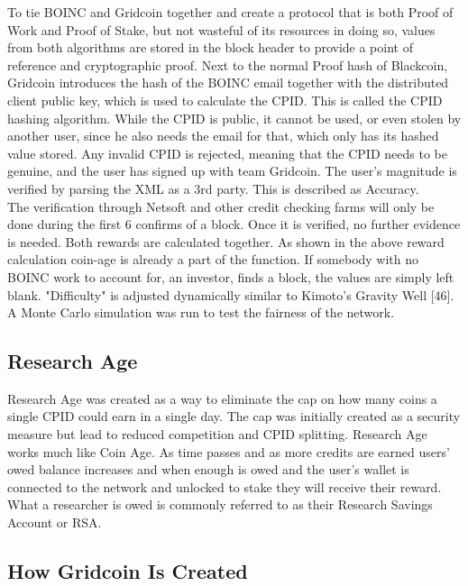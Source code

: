 To tie BOINC and Gridcoin together and create a protocol that is both Proof of Work and Proof of Stake, but not wasteful of its resources in doing so, values from both algorithms are stored in the block header to provide a point of reference and cryptographic proof. Next to the normal Proof hash of Blackcoin, Gridcoin introduces the hash of the BOINC email together with the distributed client public key, which is used to calculate the CPID. This is called the CPID hashing algorithm. While the CPID is public, it cannot be used, or even stolen by another user, since he also needs the email for that, which only has its hashed value stored. Any invalid CPID is rejected, meaning that the CPID needs to be genuine, and the user has signed up with team Gridcoin. The user's magnitude is verified by parsing the XML as a 3rd party. This is described as Accuracy.\\

The verification through Netsoft and other credit checking farms will only be done during the first 6 confirms of a block. Once it is verified, no further evidence is needed. Both rewards are calculated together. As shown in the above reward calculation coin-age is already a part of the function. If somebody with no BOINC work to account for, an investor, finds a block, the values are simply left blank. "Difficulty" is adjusted dynamically similar to Kimoto's Gravity Well [46]. A Monte Carlo simulation was run to test the fairness of the network.

\subsection{Research Age}

Research Age was created as a way to eliminate the cap on how many coins a single CPID could earn in a single day. The cap was initially created as a security measure but lead to reduced competition and CPID splitting. Research Age works much like Coin Age. As time passes and as more credits are earned users' owed balance increases and when enough is owed and the user's wallet is connected to the network and unlocked to stake they will receive their reward. What a researcher is owed is commonly referred to as their Research Savings Account or RSA.


\subsection{How Gridcoin Is Created}

